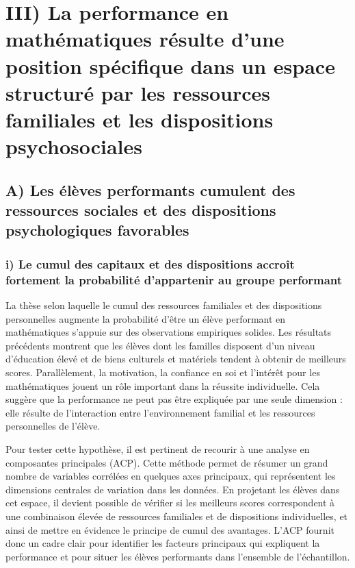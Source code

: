 \documentclass[
  french,
  11pt,
  a4paper,
]{report}
\begin{document}
\chapter{III) La performance en mathématiques résulte d'une position
spécifique dans un espace structuré par les ressources familiales et les
dispositions
psychosociales}\label{iii-la-performance-en-mathuxe9matiques-ruxe9sulte-dune-position-spuxe9cifique-dans-un-espace-structuruxe9-par-les-ressources-familiales-et-les-dispositions-psychosociales}

\section{A) Les élèves performants cumulent des ressources sociales et
des dispositions psychologiques
favorables}\label{a-les-uxe9luxe8ves-performants-cumulent-des-ressources-sociales-et-des-dispositions-psychologiques-favorables}

\subsection{i) Le cumul des capitaux et des dispositions accroît
fortement la probabilité d'appartenir au groupe
performant}\label{i-le-cumul-des-capitaux-et-des-dispositions-accrouxeet-fortement-la-probabilituxe9-dappartenir-au-groupe-performant}

La thèse selon laquelle le cumul des ressources familiales et des
dispositions personnelles augmente la probabilité d'être un élève
performant en mathématiques s'appuie sur des observations empiriques
solides. Les résultats précédents montrent que les élèves dont les
familles disposent d'un niveau d'éducation élevé et de biens culturels
et matériels tendent à obtenir de meilleurs scores. Parallèlement, la
motivation, la confiance en soi et l'intérêt pour les mathématiques
jouent un rôle important dans la réussite individuelle. Cela suggère que
la performance ne peut pas être expliquée par une seule dimension : elle
résulte de l'interaction entre l'environnement familial et les
ressources personnelles de l'élève.

Pour tester cette hypothèse, il est pertinent de recourir à une analyse
en composantes principales (ACP). Cette méthode permet de résumer un
grand nombre de variables corrélées en quelques axes principaux, qui
représentent les dimensions centrales de variation dans les données. En
projetant les élèves dans cet espace, il devient possible de vérifier si
les meilleurs scores correspondent à une combinaison élevée de
ressources familiales et de dispositions individuelles, et ainsi de
mettre en évidence le principe de cumul des avantages. L'ACP fournit
donc un cadre clair pour identifier les facteurs principaux qui
expliquent la performance et pour situer les élèves performants dans
l'ensemble de l'échantillon.
\end{document}
